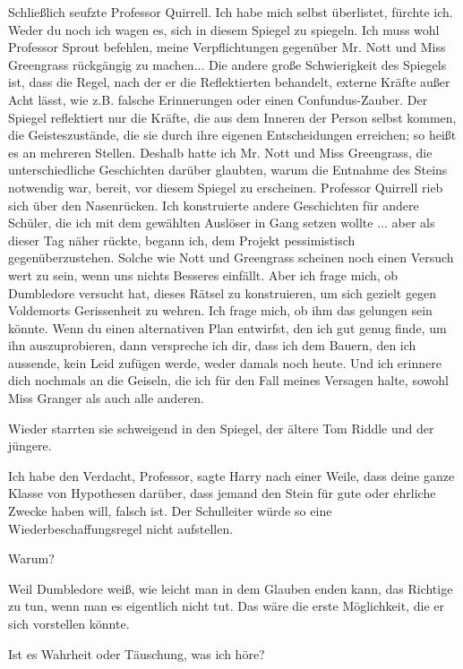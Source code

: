 Schließlich seufzte Professor Quirrell. \glqq{}Ich habe mich selbst überlistet,
fürchte ich. Weder du noch ich wagen es, sich in diesem Spiegel zu spiegeln. Ich
muss wohl Professor Sprout befehlen, meine Verpflichtungen gegenüber Mr. Nott
und Miss Greengrass rückgängig zu machen... Die andere große Schwierigkeit des
Spiegels ist, dass die Regel, nach der er die Reflektierten behandelt, externe
Kräfte außer Acht lässt, wie z.B. falsche Erinnerungen oder einen
Confundus-Zauber. Der Spiegel reflektiert nur die Kräfte, die aus dem Inneren
der Person selbst kommen, die Geisteszustände, die sie durch ihre eigenen
Entscheidungen erreichen; so heißt es an mehreren Stellen. Deshalb hatte ich Mr.
Nott und Miss Greengrass, die unterschiedliche Geschichten darüber glaubten,
warum die Entnahme des Steins notwendig war, bereit, vor diesem Spiegel zu
erscheinen.\grqq{} Professor Quirrell rieb sich über den Nasenrücken. \glqq{}Ich
konstruierte andere Geschichten für andere Schüler, die ich mit dem gewählten
Auslöser in Gang setzen wollte ... aber als dieser Tag näher rückte, begann ich,
dem Projekt pessimistisch gegenüberzustehen. Solche wie Nott und Greengrass
scheinen noch einen Versuch wert zu sein, wenn uns nichts Besseres einfällt.
Aber ich frage mich, ob Dumbledore versucht hat, dieses Rätsel zu konstruieren,
um sich gezielt gegen Voldemorts Gerissenheit zu wehren. Ich frage mich, ob ihm
das gelungen sein könnte. Wenn du einen alternativen Plan entwirfst, den ich gut
genug finde, um ihn auszuprobieren, dann verspreche ich dir, dass ich dem
Bauern, den ich aussende, kein Leid zufügen werde, weder damals noch heute. Und
ich erinnere dich nochmals an die Geiseln, die ich für den Fall meines Versagen
halte, sowohl Miss Granger als auch alle anderen.\grqq{}

Wieder starrten sie schweigend in den Spiegel, der ältere Tom Riddle und der
jüngere.

\glqq{}Ich habe den Verdacht, Professor\grqq{}, sagte Harry nach einer Weile,
\glqq{}dass deine ganze Klasse von Hypothesen darüber, dass jemand den Stein für
gute oder ehrliche Zwecke haben will, falsch ist. Der Schulleiter würde so eine
Wiederbeschaffungsregel nicht aufstellen.\grqq{}

\glqq{}Warum?\grqq{}

\glqq{}Weil Dumbledore weiß, wie leicht man in dem Glauben enden kann, das
Richtige zu tun, wenn man es eigentlich nicht tut. Das wäre die erste
Möglichkeit, die er sich vorstellen könnte.\grqq{}

\glqq{}Ist es Wahrheit oder Täuschung, was ich höre?\grqq{}

